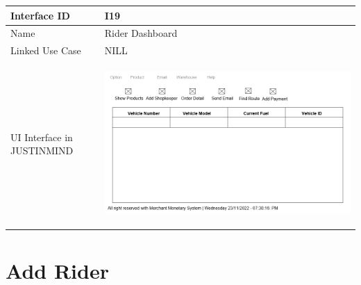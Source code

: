 \documentclass[12pt,a4paper]{report}
\begin{document}
\begin{tabular}{ | m{3cm} | m{12cm}| } \hline

Interface ID & I19  \\\hline

Name  & Rider Dashboard  \\ \hline

Linked Use Case & NILL  \\ \hline

UI Interface in JUSTINMIND & \begin{center} \includegraphics[scale=0.3]{./UIs for Latex Reports/UI-019 Rider Dashboard@1x.png}\end{center}  \\ \hline

\end{tabular} 
\section{Add Rider }
\end{document}
